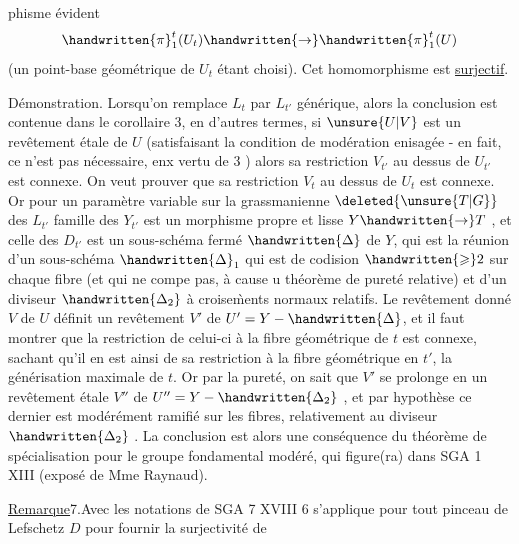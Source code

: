 %
phisme évident
\[
\handwritten{\pi}_1^t(U_t)\handwritten{\rightarrow}\handwritten{\pi}_1^t(U)
\]
(un point-base géométrique de $U_t$ étant choisi). Cet homomorphisme est \uline{surjectif}.

Démonstration. Lorsqu'on remplace $L_t$ par $L_{t'}$ générique, alors la conclusion est contenue dans le corollaire 3, en d'autres termes, si $\unsure{U|V}$ est un revêtement étale  de $U$  (satisfaisant la condition de modération enisagée - en fait, ce n'est pas nécessaire, enx vertu de 3 ) alors sa restriction $V_{t'}$ au dessus de $U_{t'}$ est connexe. On veut prouver que sa restriction $V_t$ au dessus de $U_t$ est  connexe. Or pour un paramètre variable sur  la grassmanienne $\deleted{\unsure{T|G}}$ des $L_{t'}$\handwritten{,}   famille des $Y_{t'}$ est un morphisme propre et lisse $Y\handwritten{\rightarrow}T$ , et celle des $D_{t'}$ est un sous-schéma fermé  $\handwritten{\Delta}$ de $Y$, qui est la réunion d'un sous-schéma $\handwritten{\Delta}_1$ qui est de codision $\handwritten{\geqslant}2$ sur chaque fibre (et qui ne compe pas, à cause u théorème de pureté relative) et d'un diviseur $\handwritten{\Delta_2}$ à croise\`{m}ents normaux relatifs. Le revêtement donné $V$ de $U$ définit un revêtement  $V'$ de $U'=Y-\handwritten{\Delta}$, et il faut montrer que la restriction de celui-ci à la fibre géométrique de $t$ est connexe, sachant qu'il en est ainsi de sa restriction à la fibre géométrique en  $t'$, la générisation maximale de $t$. Or par la pureté, on sait que $V'$ se prolonge en un revêtement étale $V''$ de $U''=Y-\handwritten{\Delta_2}$ , et par hypothèse ce dernier est modérément ramifié sur les fibres, relativement au diviseur $\handwritten{\Delta_2}$ . La conclusion est alors une conséquence du théorème  de spécialisation pour le groupe fondamental modéré, qui figure(ra) dans SGA 1 XIII (exposé de Mme Raynaud).

\uline{Remarque}7.Avec les notations de SGA 7 XVIII\handwritten{,} 6 s'applique pour tout pinceau de Lefschetz $D$ pour fournir la surjectivité de
